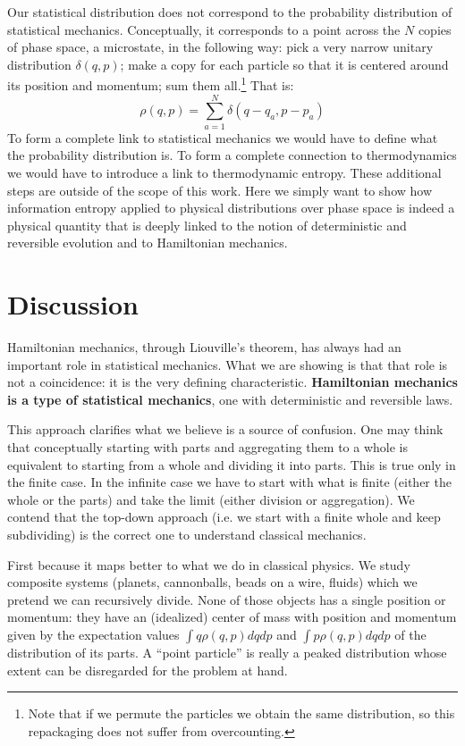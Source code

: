 \documentclass[11pt]{elsarticle}
\begin{document}
Our statistical distribution does not correspond to the probability distribution of statistical mechanics. Conceptually, it corresponds to a point across the $N$ copies of phase space, a microstate, in the following way: pick a very narrow unitary distribution $\delta(q,p)$; make a copy for each particle so that it is centered around its position and momentum; sum them all.\footnote{Note that if we permute the particles we obtain the same distribution, so this repackaging does not suffer from overcounting.} That is:
\begin{equation}
\rho(q,p) = \sum\limits_{a=1}^N \delta(q - q_a, p - p_a)
\end{equation}
To form a complete link to statistical mechanics we would have to define what the probability distribution is. To form a complete connection to thermodynamics we would have to introduce a link to thermodynamic entropy. These additional steps are outside of the scope of this work. Here we simply want to show how information entropy applied to physical distributions over phase space is indeed a physical quantity that is deeply linked to the notion of deterministic and reversible evolution and to Hamiltonian mechanics.


\section{Discussion}

Hamiltonian mechanics, through Liouville's theorem, has always had an important role in statistical mechanics. What we are showing is that that role is not a coincidence: it is the very defining characteristic. \textbf{Hamiltonian mechanics is a type of statistical mechanics}, one with deterministic and reversible laws.

This approach clarifies what we believe is a source of confusion. One may think that conceptually starting with parts and aggregating them to a whole is equivalent to starting from a whole and dividing it into parts. This is true only in the finite case. In the infinite case we have to start with what is finite (either the whole or the parts) and take the limit (either division or aggregation). We contend that the top-down approach (i.e. we start with a finite whole and keep subdividing) is the correct one to understand classical mechanics.

First because it maps better to what we do in classical physics. We study composite systems (planets, cannonballs, beads on a wire, fluids) which we pretend we can recursively divide. None of those objects has a single position or momentum: they have an (idealized) center of mass with position and momentum given by the expectation values $\int q \rho(q,p) dq dp$ and $\int p \rho(q,p) dq dp$ of the distribution of its parts. A ``point particle'' is really a peaked distribution whose extent can be disregarded for the problem at hand.
\end{document}
